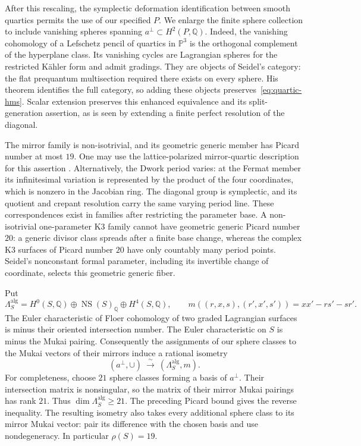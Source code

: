 \documentclass[11pt]{article}
\numberwithin{equation}{section}
\theoremstyle{definition}
\theoremstyle{remark}
\newcommand{\Q}{\mathbb Q}
\newcommand{\NS}{\operatorname{NS}}
\begin{document}
After this rescaling, the symplectic deformation identification between
smooth quartics permits the use of our specified $P$.  We enlarge the finite sphere collection to include
vanishing spheres spanning $a^\perp\subset H^2(P,\Q)$.  Indeed, the vanishing
cohomology of a Lefschetz pencil of quartics in $\mathbb P^3$ is the orthogonal
complement of the hyperplane class.  Its vanishing cycles are Lagrangian
spheres for the restricted K\"ahler form and admit gradings.  They are objects
of Seidel's category: the flat prequantum multisection required there exists
on every sphere.  His theorem identifies the full category, so adding these
objects preserves~\eqref{eq:quartic-hms}.  Scalar extension preserves this
enhanced equivalence and its split-generation assertion, as is seen by
extending a finite perfect resolution of the diagonal.

The mirror family is non-isotrivial, and its geometric generic member has
Picard number at most $19$.  One may use the lattice-polarized mirror-quartic
description for this assertion \cite{HMS:Dolgachev}.  Alternatively, the Dwork
period varies: at the Fermat member its infinitesimal variation is represented
by the product of the four coordinates, which is nonzero in the Jacobian
ring.  The diagonal group is symplectic, and its quotient and crepant resolution
carry the same varying period line.  These correspondences exist in families
after restricting the parameter base.  A non-isotrivial one-parameter K3
family cannot have geometric generic Picard number $20$: a generic divisor
class spreads after a finite base change, whereas the complex K3 surfaces of
Picard number $20$ have only countably many period points.  Seidel's
nonconstant formal parameter, including its invertible change of coordinate,
selects this geometric generic fiber.

Put
\[
 \Lambda_S^{\mathrm{alg}}=H^0(S,\Q)\oplus\NS(S)_\Q\oplus H^4(S,\Q),
 \qquad
 m((r,x,s),(r',x',s'))=xx'-rs'-sr'.
\]
The Euler characteristic of Floer cohomology of two graded Lagrangian
surfaces is minus their oriented intersection number.  The Euler
characteristic on $S$ is minus the Mukai pairing.  Consequently the assignments
of our sphere classes to the Mukai vectors of their mirrors induce a rational
isometry
\begin{equation}\label{eq:mirror-lattice}
 (a^\perp,\cup)\ \xrightarrow{\ \sim\ }\
 (\Lambda_S^{\mathrm{alg}},m).
\end{equation}
For completeness, choose $21$ sphere classes forming a basis of $a^\perp$.
Their intersection matrix is nonsingular, so the matrix of their mirror
Mukai pairings has rank $21$.  Thus $\dim\Lambda_S^{\mathrm{alg}}\ge21$.
The preceding Picard bound gives the reverse inequality.  The resulting
isometry also takes every additional sphere class to its mirror Mukai
vector: pair its difference with the chosen basis and use nondegeneracy.
In particular $\rho(S)=19$.
\end{document}
